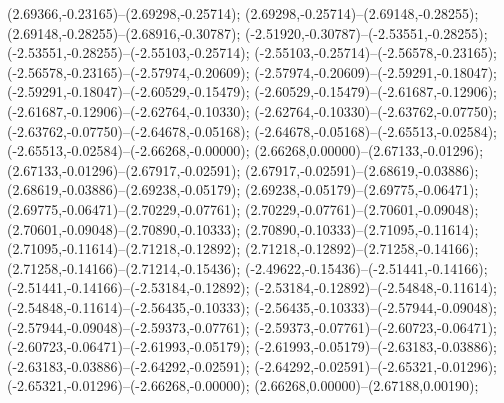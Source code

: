  (2.69366,-0.23165)--(2.69298,-0.25714);
 (2.69298,-0.25714)--(2.69148,-0.28255);
 (2.69148,-0.28255)--(2.68916,-0.30787);
 (-2.51920,-0.30787)--(-2.53551,-0.28255);
 (-2.53551,-0.28255)--(-2.55103,-0.25714);
 (-2.55103,-0.25714)--(-2.56578,-0.23165);
 (-2.56578,-0.23165)--(-2.57974,-0.20609);
 (-2.57974,-0.20609)--(-2.59291,-0.18047);
 (-2.59291,-0.18047)--(-2.60529,-0.15479);
 (-2.60529,-0.15479)--(-2.61687,-0.12906);
 (-2.61687,-0.12906)--(-2.62764,-0.10330);
 (-2.62764,-0.10330)--(-2.63762,-0.07750);
 (-2.63762,-0.07750)--(-2.64678,-0.05168);
 (-2.64678,-0.05168)--(-2.65513,-0.02584);
 (-2.65513,-0.02584)--(-2.66268,-0.00000);
 (2.66268,0.00000)--(2.67133,-0.01296);
 (2.67133,-0.01296)--(2.67917,-0.02591);
 (2.67917,-0.02591)--(2.68619,-0.03886);
 (2.68619,-0.03886)--(2.69238,-0.05179);
 (2.69238,-0.05179)--(2.69775,-0.06471);
 (2.69775,-0.06471)--(2.70229,-0.07761);
 (2.70229,-0.07761)--(2.70601,-0.09048);
 (2.70601,-0.09048)--(2.70890,-0.10333);
 (2.70890,-0.10333)--(2.71095,-0.11614);
 (2.71095,-0.11614)--(2.71218,-0.12892);
 (2.71218,-0.12892)--(2.71258,-0.14166);
 (2.71258,-0.14166)--(2.71214,-0.15436);
 (-2.49622,-0.15436)--(-2.51441,-0.14166);
 (-2.51441,-0.14166)--(-2.53184,-0.12892);
 (-2.53184,-0.12892)--(-2.54848,-0.11614);
 (-2.54848,-0.11614)--(-2.56435,-0.10333);
 (-2.56435,-0.10333)--(-2.57944,-0.09048);
 (-2.57944,-0.09048)--(-2.59373,-0.07761);
 (-2.59373,-0.07761)--(-2.60723,-0.06471);
 (-2.60723,-0.06471)--(-2.61993,-0.05179);
 (-2.61993,-0.05179)--(-2.63183,-0.03886);
 (-2.63183,-0.03886)--(-2.64292,-0.02591);
 (-2.64292,-0.02591)--(-2.65321,-0.01296);
 (-2.65321,-0.01296)--(-2.66268,-0.00000);
 (2.66268,0.00000)--(2.67188,0.00190);

